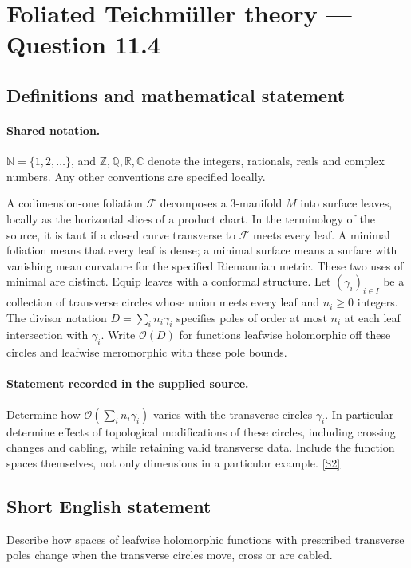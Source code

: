\documentclass[11pt]{article}
\newcommand{\sref}[2]{\hyperlink{source:#1:#2}{[S#2]}}
\begin{document}
\section{Foliated Teichmüller theory — Question 11.4}\label{statement}

\subsection{Definitions and mathematical statement}

\paragraph{Shared notation.}$\mathbb N=\{1,2,\ldots\}$, and $\mathbb Z,\mathbb Q,\mathbb R,\mathbb C$ denote the integers, rationals, reals and complex numbers. Any other conventions are specified locally.


A codimension-one foliation $\mathcal F$ decomposes a $3$-manifold $M$ into surface leaves, locally as the horizontal slices of a product chart. In the terminology of the source, it is taut if a closed curve transverse to $\mathcal F$ meets every leaf. A minimal foliation means that every leaf is dense; a minimal surface means a surface with vanishing mean curvature for the specified Riemannian metric. These two uses of minimal are distinct. Equip leaves with a conformal structure. Let $(\gamma_i)_{i\in I}$ be a collection of transverse circles whose union meets every leaf and $n_i\ge0$ integers. The divisor notation $D=\sum_i n_i\gamma_i$ specifies poles of order at most $n_i$ at each leaf intersection with $\gamma_i$. Write $\mathscr O(D)$ for functions leafwise holomorphic off these circles and leafwise meromorphic with these pole bounds.
\paragraph{Statement recorded in the supplied source.}
Determine how $\mathscr O(\sum_i n_i\gamma_i)$ varies with the transverse circles $\gamma_i$. In particular determine effects of topological modifications of these circles, including crossing changes and cabling, while retaining valid transverse data. Include the function spaces themselves, not only dimensions in a particular example. \sref{statement}{2}
\subsection{Short English statement}
Describe how spaces of leafwise holomorphic functions with prescribed transverse poles change when the transverse circles move, cross or are cabled.
\end{document}
